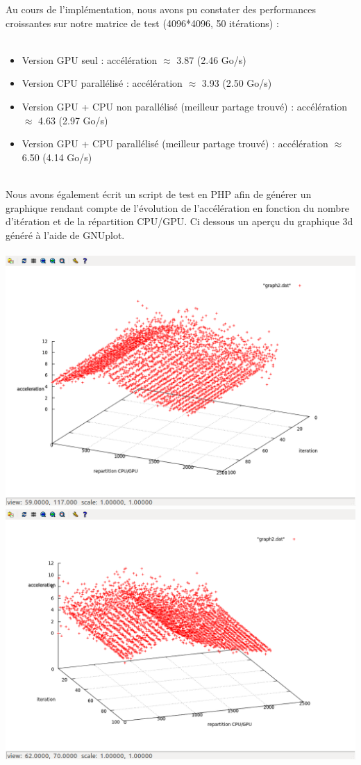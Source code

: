 \documentclass[a4paper,oneside,12pt]{article}
\begin{document}
Au cours de l'implémentation, nous avons pu constater des performances croissantes 
sur notre matrice de test (4096*4096, 50 itérations) :\\\\
\begin{itemize}
\item Version GPU seul : accélération $\approx$ 3.87 (2.46 Go/s) 
\item Version CPU parallélisé : accélération $\approx$ 3.93 (2.50 Go/s)
\item Version GPU + CPU non parallélisé (meilleur partage trouvé) : accélération $\approx$ 4.63 (2.97 Go/s)
\item Version GPU + CPU parallélisé (meilleur partage trouvé) : accélération $\approx$ 6.50 (4.14 Go/s)\\\\
\end{itemize}

Nous avons également écrit un script de test en PHP afin de générer un graphique rendant compte de l'évolution de l'accélération 
en fonction du nombre d'itération et de la répartition CPU/GPU. Ci dessous un aperçu du graphique 3d généré 
à l'aide de GNUplot.
~~\\\\
\includegraphics[width=1\textwidth]{graph1.png}\\
\includegraphics[width=1\textwidth]{graph2.png}\\
\end{document}
